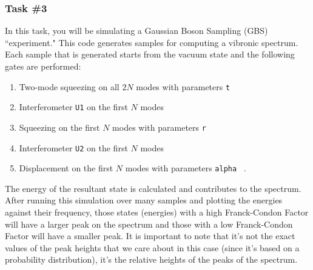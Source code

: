\documentclass[12pt]{article}
\begin{document}
\subsubsection*{Task \#3}
In this task, you will be simulating a Gaussian Boson Sampling (GBS) ``experiment." This code generates samples for computing a vibronic spectrum. Each sample that is generated starts from the vacuum state and the following gates are performed\cite{killoran2019strawberry, bromley2020applications}:
\begin{enumerate}
\item Two-mode squeezing on all  $2N$  modes with parameters \texttt{t}
\item Interferometer \texttt{U1} on the first $ N$ modes
\item Squeezing on the first $N$ modes with parameters \texttt{r}
\item Interferometer \texttt{U2} on the first  $N$ modes
\item Displacement on the first  $N$ modes with parameters \texttt{alpha} ~.
\end{enumerate}

The energy of the resultant state is calculated and contributes to the spectrum. After running this simulation over many samples and plotting the energies against their frequency, those states (energies) with a high Franck-Condon Factor will have a larger peak on the spectrum and those with a low Franck-Condon Factor will have a smaller peak. It is important to note that it's not the exact values of the peak heights that we care about in this case (since it's based on a probability distribution), it's the relative heights of the peaks of the spectrum.


\hspace{20mm}
\end{document}
